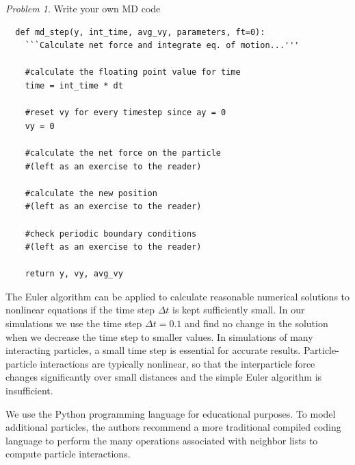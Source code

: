 \documentclass[preprint,showpacs,preprintnumbers,amsmath,amssymb,aps,prb]{revtex4-1}
\theoremstyle{remark}
\newtheorem{problem}{Problem}
\begin{document}
\begin{problem}{Write your own MD code}
\begin{enumerate}
\begin{verbatim}
  def md_step(y, int_time, avg_vy, parameters, ft=0):
    ```Calculate net force and integrate eq. of motion...'''

    #calculate the floating point value for time
    time = int_time * dt

    #reset vy for every timestep since ay = 0 
    vy = 0 

    #calculate the net force on the particle
    #(left as an exercise to the reader)

    #calculate the new position
    #(left as an exercise to the reader)

    #check periodic boundary conditions
    #(left as an exercise to the reader)

    return y, vy, avg_vy

\end{verbatim}

    
  \end{enumerate}

  The Euler algorithm can be applied to
  calculate reasonable numerical solutions to 
  nonlinear
  equations if the time step $\Delta t$
  is kept sufficiently small.\cite{Newman}
  In our simulations we use the time step $\Delta t = 0.1$
  and find no change in the solution
  when we decrease the time step to smaller values.
  In simulations of
  many interacting particles,
  a small
  time step is essential for accurate results.
  Particle-particle interactions are typically nonlinear,
  so that the interparticle force changes significantly over small distances and the simple Euler algorithm is insufficient.

  We use the Python programming
  language
  for educational purposes.
  To model additional particles,
  the authors recommend a more traditional 
  compiled coding language
  to perform the many operations associated
  with neighbor lists to compute particle interactions.
  
\end{problem}
\end{document}
